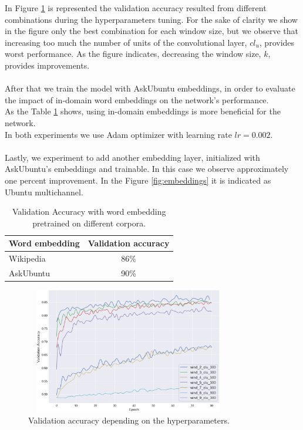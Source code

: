\documentclass[10pt,twocolumn,letterpaper]{article}
\begin{document}
In Figure \ref{fig:wiki} is represented the validation accuracy resulted from different combinations during the hyperparameters tuning. For the sake of clarity we show in the figure only the best combination for each window size, but we observe that increasing too much the number of units of the convolutional layer, $cl_{u}$, provides worst performance.  As the figure indicates, decreasing the window size, $k$, provides improvements. \\~\\
After that we train the model with AskUbuntu embeddings, in order to evaluate the impact of in-domain word embeddings on the network's performance. \\
As the Table \ref{table:accuracy} shows, using in-domain embeddings is more beneficial for the network. \\
In both experiments we use Adam optimizer with learning rate $ lr=0.002 $. \\~\\
Lastly, we experiment to add another embedding layer, initialized with AskUbuntu's embeddings and trainable. In this case we observe approximately one percent improvement. In the Figure \ref{fig:embeddings} it is indicated as Ubuntu multichannel.
\begin{table}
\begin{center}
\begin{tabular}{|l|c|}
\hline
Word embedding & Validation accuracy \\
\hline
Wikipedia & 86\% \\
AskUbuntu & 90\% \\
\hline
\end{tabular}
\end{center}
\caption{Validation Accuracy with word embedding pretrained on different corpora.}
\label{table:accuracy}
\end{table}
\begin{figure}[t]
\begin{center}
\includegraphics[width=90mm, height= 55mm, scale=1]{img/wiki.png}
\end{center}
\caption{Validation accuracy depending on the hyperparameters.}
\label{fig:wiki}
\end{figure}
\end{document}
